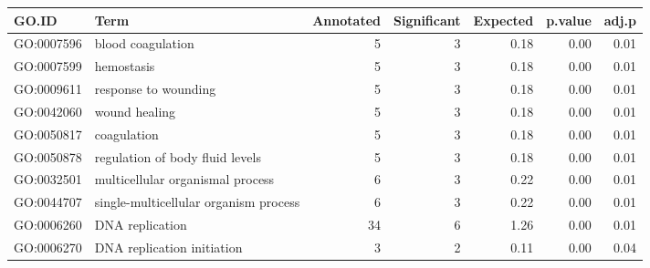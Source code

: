 \begin{table}[ht]
\centering
\begin{tabular}{llrrrrr}
  \hline
GO.ID & Term & Annotated & Significant & Expected & p.value & adj.p \\ 
  \hline
GO:0007596 & blood coagulation &   5 &   3 & 0.18 & 0.00 & 0.01 \\ 
  GO:0007599 & hemostasis &   5 &   3 & 0.18 & 0.00 & 0.01 \\ 
  GO:0009611 & response to wounding &   5 &   3 & 0.18 & 0.00 & 0.01 \\ 
  GO:0042060 & wound healing &   5 &   3 & 0.18 & 0.00 & 0.01 \\ 
  GO:0050817 & coagulation &   5 &   3 & 0.18 & 0.00 & 0.01 \\ 
  GO:0050878 & regulation of body fluid levels &   5 &   3 & 0.18 & 0.00 & 0.01 \\ 
  GO:0032501 & multicellular organismal process &   6 &   3 & 0.22 & 0.00 & 0.01 \\ 
  GO:0044707 & single-multicellular organism process &   6 &   3 & 0.22 & 0.00 & 0.01 \\ 
  GO:0006260 & DNA replication &  34 &   6 & 1.26 & 0.00 & 0.01 \\ 
  GO:0006270 & DNA replication initiation &   3 &   2 & 0.11 & 0.00 & 0.04 \\ 
   \hline
\end{tabular}
\end{table}
